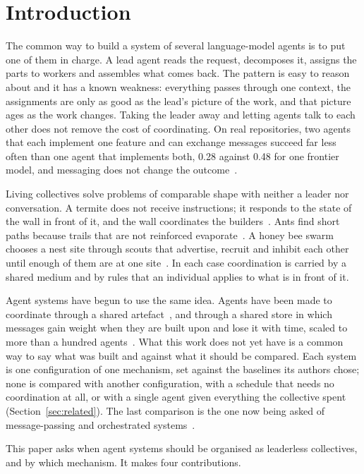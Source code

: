 \documentclass[10pt,twocolumn]{article}
\begin{document}
\section{Introduction}

The common way to build a system of several language-model agents is to put one of them in charge. A lead agent reads the request, decomposes it, assigns the parts to workers and assembles what comes back. The pattern is easy to reason about and it has a known weakness: everything passes through one context, the assignments are only as good as the lead's picture of the work, and that picture ages as the work changes. Taking the leader away and letting agents talk to each other does not remove the cost of coordinating. On real repositories, two agents that each implement one feature and can exchange messages succeed far less often than one agent that implements both, 0.28 against 0.48 for one frontier model, and messaging does not change the outcome~\cite{khatua2026}.

Living collectives solve problems of comparable shape with neither a leader nor conversation. A termite does not receive instructions; it responds to the state of the wall in front of it, and the wall coordinates the builders~\cite{grasse1959,theraulaz1999}. Ants find short paths because trails that are not reinforced evaporate~\cite{goss1989}. A honey bee swarm chooses a nest site through scouts that advertise, recruit and inhibit each other until enough of them are at one site~\cite{seeley2003,seeley2012}. In each case coordination is carried by a shared medium and by rules that an individual applies to what is in front of it.

Agent systems have begun to use the same idea. Agents have been made to coordinate through a shared artefact~\cite{rodriguez2026,pal2026}, and through a shared store in which messages gain weight when they are built upon and lose it with time, scaled to more than a hundred agents~\cite{qi2026}. What this work does not yet have is a common way to say what was built and against what it should be compared. Each system is one configuration of one mechanism, set against the baselines its authors chose; none is compared with another configuration, with a schedule that needs no coordination at all, or with a single agent given everything the collective spent (Section~\ref{sec:related}). The last comparison is the one now being asked of message-passing and orchestrated systems~\cite{fan2026,kim2025,gao2026}.

This paper asks when agent systems should be organised as leaderless collectives, and by which mechanism. It makes four contributions.
\end{document}
